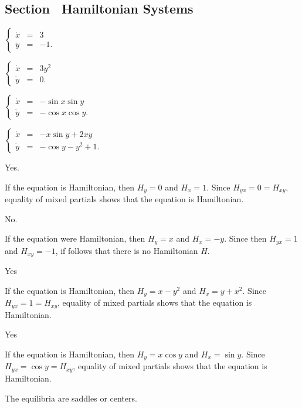 \subsection*{Section~\protect{\ref{sec:HamSys}} Hamiltonian Systems}


 \ans $\left\{\begin{array}{rcl}
	\dot{x} & = & 3 \\ \dot{y} & = & -1. \end{array}\right.$

\newpage
{} \ans $\left\{\begin{array}{rcl}
	\dot{x} & = & 3y^2 \\ \dot{y} & = & 0. \end{array}\right.$

 \ans $\left\{\begin{array}{rcl}
\dot{x} & = & -\sin x\sin y \\ \dot{y} & = & -\cos x\cos y. \end{array}\right.$

 \ans $\left\{\begin{array}{rcl}
\dot{x} & = & -x\sin y + 2xy \\ \dot{y} & = & -\cos y -y^2 +1. \end{array}\right.$


 \ans Yes.

\soln If the equation is Hamiltonian, then $H_y=0$ and $H_x=1$.  Since 
$H_{yx}=0=H_{xy}$, equality of mixed partials shows that the equation is
Hamiltonian.

 \ans No.

\soln If the equation were Hamiltonian, then $H_y=x$ and $H_x=-y$.  Since 
then $H_{yx}=1$ and $H_{xy}=-1$, if follows that there is no Hamiltonian $H$. 

 \ans Yes

\soln  If the equation is Hamiltonian, then $H_y=x-y^2$ and $H_x=y+x^2$.  
Since $H_{yx}=1=H_{xy}$, equality of mixed partials shows that the equation 
is Hamiltonian.

 \ans Yes

\soln  If the equation is Hamiltonian, then $H_y=x\cos y$ and $H_x=\sin y$.  
Since $H_{yx}=\cos y =H_{xy}$, equality of mixed partials shows that the 
equation is Hamiltonian.


 \ans The equilibria are saddles or centers.


